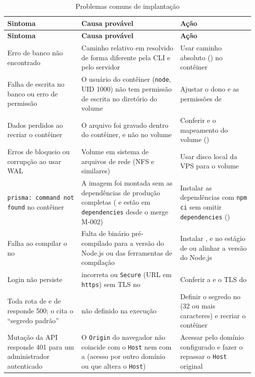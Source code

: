 \begin{longtable}{@{}L{4.2cm}L{4.5cm}L{5.3cm}@{}}
\caption{Problemas comuns de implantação}\label{tab:problemas}\\
\toprule
\textbf{Sintoma} & \textbf{Causa provável} & \textbf{Ação}\\
\midrule
\endfirsthead
\toprule
\textbf{Sintoma} & \textbf{Causa provável} & \textbf{Ação}\\
\midrule
\endhead
\bottomrule
\endfoot
Erro de banco não encontrado & Caminho relativo em  resolvido de forma diferente pela CLI e pelo servidor & Usar caminho absoluto () no contêiner\\[1pt]
Falha de escrita no banco ou erro de permissão & O usuário do contêiner (\texttt{node}, UID 1000) não tem permissão de escrita no diretório do volume & Ajustar o dono e as permissões de \\[1pt]
Dados perdidos ao recriar o contêiner & O arquivo foi gravado dentro do contêiner, e não no volume & Conferir  e o mapeamento do volume ()\\[1pt]
Erros de bloqueio ou corrupção ao usar WAL & Volume em sistema de arquivos de rede (NFS e similares) & Usar disco local da VPS para o volume\\[1pt]
\texttt{prisma: command not found} no contêiner & A imagem foi montada sem as dependências de produção completas ( e  estão em \texttt{dependencies} desde o merge M-002) & Instalar as dependências com \texttt{npm ci} sem omitir \texttt{dependencies} ()\\[1pt]
Falha ao compilar o  no  & Falta de binário pré-compilado para a versão do Node.js ou das ferramentas de compilação & Instalar ,  e  no estágio de  ou alinhar a versão do Node.js\\[1pt]
Login não persiste &  incorreta ou  \texttt{Secure} (URL em \texttt{https}) sem TLS no  & Conferir a  e o TLS do \\[1pt]
Toda rota de  e de  responde 500; o  cita o ``segredo padrão'' &  não definido na execução & Definir o segredo no  (32 ou mais caracteres) e recriar o contêiner\\[1pt]
Mutação da API responde 401 para um administrador autenticado & O \texttt{Origin} do navegador não coincide com o \texttt{Host} nem com a  (acesso por outro domínio ou  que altera o \texttt{Host}) & Acessar pelo domínio configurado e fazer o  repassar o \texttt{Host} original\\[1pt]

\end{longtable}
